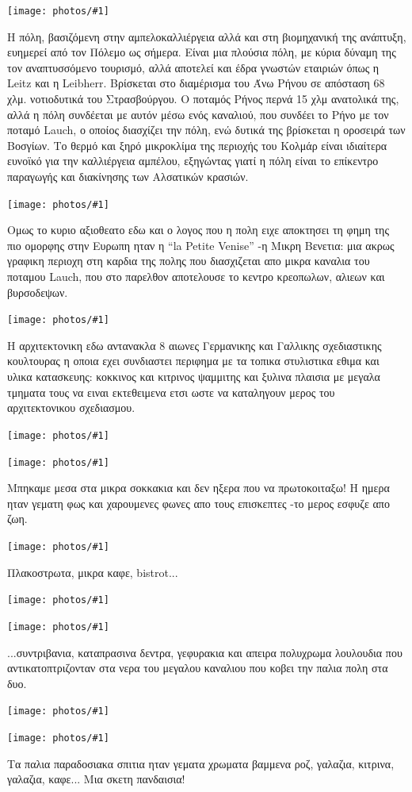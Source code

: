 \documentclass[11pt, letterpaper]{book}
\newcommand\photo[1]{\begin{center}\noindent\texttt{[image: photos/\#1]}\end{center}}
\begin{document}
\photo{93.jpg}

Η πόλη, βασιζόμενη στην αμπελοκαλλιέργεια αλλά και στη βιομηχανική της ανάπτυξη, ευημερεί από τον Πόλεμο ως σήμερα. Είναι μια πλούσια πόλη, με κύρια δύναμη της τον αναπτυσσόμενο τουρισμό, αλλά αποτελεί και έδρα γνωστών εταιριών όπως η Leitz και η Leibherr.
Βρίσκεται στο διαμέρισμα του Άνω Ρήνου σε απόσταση 68 χλμ. νοτιοδυτικά του Στρασβούργου. Ο ποταμός Ρήνος περνά 15 χλμ ανατολικά της, αλλά η πόλη συνδέεται με αυτόν μέσω ενός καναλιού, που συνδέει το Ρήνο με τον ποταμό Lauch, ο οποίος διασχίζει την πόλη, ενώ δυτικά της βρίσκεται η οροσειρά των Βοσγίων. Το θερμό και ξηρό μικροκλίμα της περιοχής του Κολμάρ είναι ιδιαίτερα ευνοϊκό για την καλλιέργεια αμπέλου, εξηγώντας γιατί η πόλη είναι το επίκεντρο παραγωγής και διακίνησης των Αλσατικών κρασιών.

\photo{94.jpg}

Ομως το κυριο αξιοθεατο εδω και ο λογος που η πολη ειχε αποκτησει τη φημη της πιο ομορφης στην Ευρωπη ηταν η ``la Petite Venise'' -η Μικρη Βενετια: μια ακρως γραφικη περιοχη στη καρδια της πολης που διασχιζεται απο μικρα καναλια του ποταμου Lauch, που στο παρελθον αποτελουσε το κεντρο κρεοπωλων, αλιεων και βυρσοδεψων.

\photo{95.jpg}

Η αρχιτεκτονικη εδω αντανακλα 8 αιωνες Γερμανικης και Γαλλικης σχεδιαστικης κουλτουρας η οποια εχει συνδιαστει περιφημα με τα τοπικα στυλιστικα εθιμα και υλικα κατασκευης: κοκκινος και κιτρινος ψαμμιτης και ξυλινα πλαισια με μεγαλα τμηματα τους να ειναι εκτεθειμενα ετσι ωστε να καταληγουν μερος του αρχιτεκτονικου σχεδιασμου.

\photo{96.jpg}
\photo{97.jpg}

Μπηκαμε μεσα στα μικρα σοκκακια και δεν ηξερα που να πρωτοκοιταξω!
Η ημερα ηταν γεματη φως και χαρουμενες φωνες απο τους επισκεπτες -το μερος εσφυζε απο ζωη.

\photo{98.jpg}

Πλακοστρωτα, μικρα καφε, bistrot...

\photo{99.jpg}
\photo{100.jpg}

...συντριβανια, καταπρασινα δεντρα, γεφυρακια και απειρα πολυχρωμα λουλουδια που αντικατοπτριζονταν στα νερα του μεγαλου καναλιου που κοβει την παλια πολη στα δυο.

\photo{101.jpg}
\photo{102.jpg}

Τα παλια παραδοσιακα σπιτια ηταν γεματα χρωματα βαμμενα ροζ, γαλαζια, κιτρινα, γαλαζια, καφε...
Μια σκετη πανδαισια!
\end{document}
